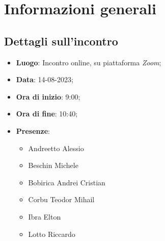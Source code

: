 \section{Informazioni generali}

\subsection{Dettagli sull'incontro}
\begin{itemize}
\item \textbf{Luogo}: Incontro online, su piattaforma \textit{Zoom\glo};
\item \textbf{Data}: 14-08-2023;
\item \textbf{Ora di inizio}: 9:00;
\item \textbf{Ora di fine}: 10:40;
\item \textbf{Presenze}: 
\begin{itemize}
	\item Andreetto Alessio
    \item Beschin Michele
    \item Bobirica Andrei Cristian
    \item Corbu Teodor Mihail
    \item Ibra Elton
    \item Lotto Riccardo 
\end{itemize}
\end{itemize}



